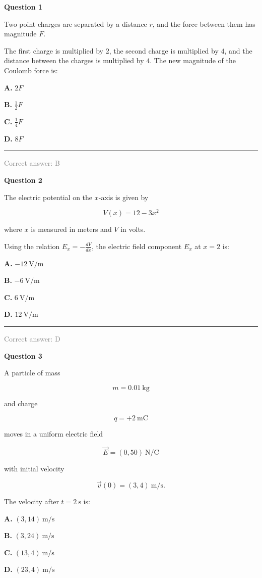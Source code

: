 \documentclass[11pt,a4paper]{article}
\newcommand{\answernote}[1]{%
\vfill
\noindent\textcolor{gray}{\rule{\linewidth}{0.4pt}}

{\small\textcolor{gray}{Correct answer: #1}}
}
\begin{document}
{\LARGE\textbf{Question 1}}

Two point charges are separated by a distance $r$, and the force between them has magnitude $F$.

The first charge is multiplied by $2$, the second charge is multiplied by $4$, and the distance between the charges is multiplied by $4$. The new magnitude of the Coulomb force is:

\vspace{0.5em}

{\large
\textbf{A.} $2F$

\textbf{B.} $\frac{1}{2}F$

\textbf{C.} $\frac{1}{4}F$

\textbf{D.} $8F$
}

\answernote{B}
\newpage

{\LARGE\textbf{Question 2}}

The electric potential on the $x$-axis is given by

\[
V(x)=12-3x^2
\]

where $x$ is measured in meters and $V$ in volts.

Using the relation $E_x=-\frac{dV}{dx}$, the electric field component $E_x$ at $x=2$ is:

\vspace{0.5em}

{\large
\textbf{A.} $-12\ \mathrm{V/m}$

\textbf{B.} $-6\ \mathrm{V/m}$

\textbf{C.} $6\ \mathrm{V/m}$

\textbf{D.} $12\ \mathrm{V/m}$
}

\answernote{D}
\newpage

{\LARGE\textbf{Question 3}}

A particle of mass

\[
m=0.01\ \mathrm{kg}
\]

and charge

\[
q=+2\ \mathrm{mC}
\]

moves in a uniform electric field

\[
\vec E=(0,50)\ \mathrm{N/C}
\]

with initial velocity

\[
\vec v(0)=(3,4)\ \mathrm{m/s}.
\]

The velocity after $t=2\ \mathrm{s}$ is:

\vspace{0.5em}

{\large
\textbf{A.} $(3,14)\ \mathrm{m/s}$

\textbf{B.} $(3,24)\ \mathrm{m/s}$

\textbf{C.} $(13,4)\ \mathrm{m/s}$

\textbf{D.} $(23,4)\ \mathrm{m/s}$
}
\end{document}

